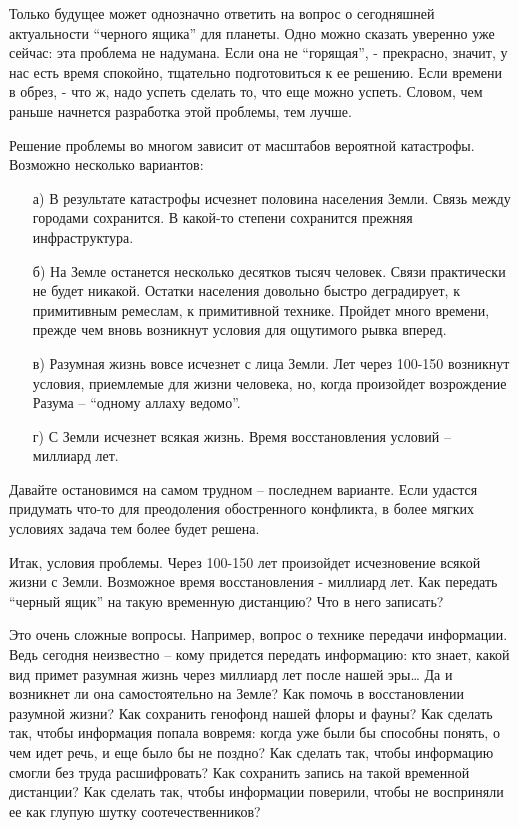 \documentclass[11pt,a4paper]{article}
\begin{document}
{Только будущее может однозначно ответить на вопрос о сегодняшней актуальности
“черного ящика” для планеты. Одно можно сказать уверенно уже сейчас: эта
проблема не надумана. Если она не “горящая”, - прекрасно, значит, у нас есть
время спокойно, тщательно подготовиться к ее решению. Если времени в обрез, -
что ж, надо успеть сделать то, что еще можно успеть. Словом, чем раньше
начнется разработка этой проблемы, тем лучше.

Решение проблемы во многом зависит от масштабов вероятной катастрофы. Возможно
несколько вариантов:
\begin{itemize}[noitemsep]
\item[а)] В результате катастрофы исчезнет половина населения Земли. Связь
  между городами сохранится. В какой-то степени сохранится прежняя
  инфраструктура.
\item[б)] На Земле останется несколько десятков тысяч человек. Связи
  практически не будет никакой. Остатки населения довольно быстро деградирует,
  к примитивным ремеслам, к примитивной технике. Пройдет много времени, прежде
  чем вновь возникнут условия для ощутимого рывка вперед.
\item[в)] Разумная жизнь вовсе исчезнет с лица Земли. Лет через 100-150
  возникнут условия, приемлемые для жизни человека, но, когда произойдет
  возрождение Разума – “одному аллаху ведомо”.
\item[г)] С Земли исчезнет всякая жизнь. Время восстановления условий –
  миллиард лет.
\end{itemize}
Давайте остановимся на самом трудном – последнем варианте. Если удастся
придумать что-то для преодоления обостренного конфликта, в более мягких
условиях задача тем более будет решена.

Итак, условия проблемы. Через 100-150 лет произойдет исчезновение всякой жизни
с Земли. Возможное время восстановления - миллиард лет. Как передать “черный
ящик” на такую временную дистанцию? Что в него записать?

Это очень сложные вопросы. Например, вопрос о технике передачи
информации. Ведь сегодня неизвестно – кому придется передать информацию: кто
знает, какой вид примет разумная жизнь через миллиард лет после нашей эры… Да
и возникнет ли она самостоятельно на Земле? Как помочь в восстановлении
разумной жизни? Как сохранить генофонд нашей флоры и фауны? Как сделать так,
чтобы информация попала вовремя: когда уже были бы способны понять, о чем идет
речь, и еще было бы не поздно? Как сделать так, чтобы информацию смогли без
труда расшифровать? Как сохранить запись на такой временной дистанции? Как
сделать так, чтобы информации поверили, чтобы не восприняли ее как глупую
шутку соотечественников?

}
\end{document}
